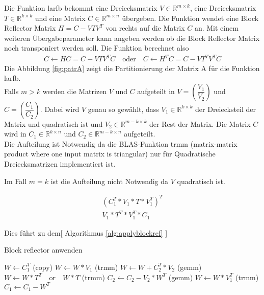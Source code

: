 Die Funktion larfb bekommt eine Dreiecksmatrix $V \in \mathbb{R}^{m \times k}$, eine Dreiecksmatrix $T \in \mathbb{R}^{k \times k}$ und eine Matrix $C \in \mathbb{R}^{m \times n }$ übergeben.
Die Funktion wendet eine  Block Reflector Matrix $ 	H = C - V T V^T $ von rechts auf die Matrix $ C $ an. 
Mit einem weiteren Übergabeparameter kann angeben werden ob die Block Reflector Matrix noch transponiert werden soll.
Die Funktion berechnet also
\begin{align*}
	C \leftarrow H C = C - V T V^T C \quad \text{oder} \quad 	C \leftarrow H^T C = C - V T^T V^T C
\end{align*}
Die Abbildung \ref{fig:patrA} zeigt die Partitionierung der Matrix A für die Funktion larfb.\\
Falls $m > k $ werden die Matrizen $V$ und $C$ aufgeteilt in $V=\left(\dfrac{V_1}{V_2}\right)$ und $C=\left(\dfrac{C_1}{C_2}\right)$. Dabei wird $V$ genau so gewählt, dass $V_1 \in \mathbb{R}^{k\times k}$ der Dreiecksteil der Matrix und quadratisch ist und $V_2 \in \mathbb{R}^{m-k\times k}$ der Rest der Matrix. Die Matrix $C$ wird in $C_1 \in \mathbb{R}^{k \times n}$ und $C_2 \in \mathbb{R}^{m-k \times n}$  aufgeteilt.\\
Die Aufteilung ist Notwendig da die BLAS-Funktion trmm (matrix-matrix product where one input matrix is triangular) nur für Quadratische Dreiecksmatrizen implementiert ist.

Im Fall $ m = k $ ist die Aufteilung nicht Notwendig da $ V $ quadratisch ist.

\begin{align*}
	(C_1^T * V_1 * T *V_1^T)^T\\
	V_1 * T^T * V_1^T * C_1
\end{align*}



Dies führt zu dem[ Algorithmus \ref{alg:applyblockref} ]\\
\begin{algorithm}
	\caption{Block reflector anwenden}
	\label{alg:applyblockref}
	\begin{algorithmic}
		\State 	$W \leftarrow C_1^T$ (copy)
		\State	$W \leftarrow W * V_1 $ (trmm)
			\State $W \leftarrow W + C_2^T*V_2$ (gemm)
		\EndIf
		\State 	$ W \leftarrow W * T^T \quad \text{or}\quad  W * T$ (trmm)
			\State $C_2 \leftarrow C_2 - V_2 * W^T$ (gemm)
		\EndIf
		\State 	$ W \leftarrow W * V_1^T $ (trmm)
		\State 	$ C_1 \leftarrow C_1 - W^T $
	\end{algorithmic}
\end{algorithm}


